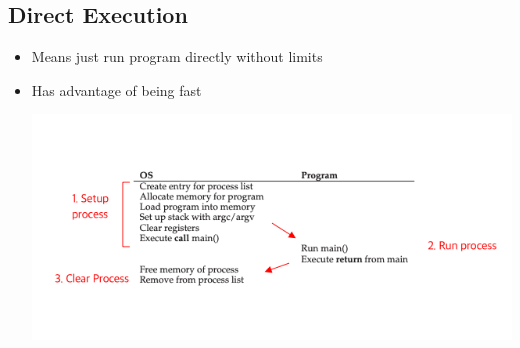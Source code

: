 \documentclass[12pt]{article}
\begin{document}
\subsection{Direct Execution}
\begin{itemize}
    \item Means just run program directly without limits
    \item Has advantage of being fast

    \begin{center}
    \includegraphics[width=0.6\linewidth]{images/notes_4_8.png}
    \end{center}
\end{itemize}
\end{document}

